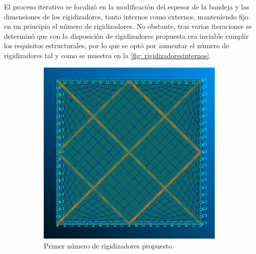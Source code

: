 El proceso iterativo se focalizó en la modificación del espesor de la bandeja y las dimensiones de los rigidizadores, tanto internos como externos, manteniendo fijo en un principio el número de rigidizadores. No obstante, tras varias iteraciones se determinó que con la disposición de rigidizadores propuesta era  inviable cumplir los requisitos estructurales, por lo que se optó por aumentar el número de rigidizadores tal y como se muestra en la \autoref{fig: rigidizadoresinternos}.

\begin{figure}[H]  
  \begin{subfigure}[b]{0.5\linewidth}
  \centering
    \includegraphics[scale = 0.35]{Figures/1rigpng.png} 
    \caption{Primer número de rigidizadores propuesto.}
  \end{subfigure} 
  \begin{subfigure}[b]{0.5\linewidth}
  \centering

\end{subfigure}
\end{figure}
